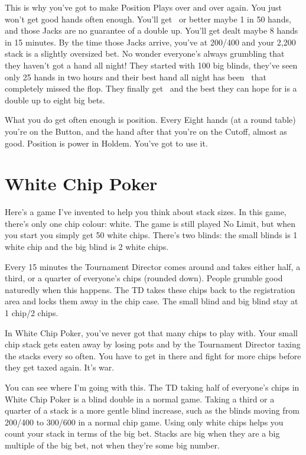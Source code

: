 This is why you've got to make Position Plays over and over again.
You just won't get good hands often enough. You'll get \Jh\Jc\ or better
maybe 1 in 50 hands, and those Jacks are no guarantee of a double up.
You'll get dealt maybe 8 hands in 15 minutes.
By the time those Jacks arrive, you've at 200/400 and your 2,200 stack is
a slightly oversized bet. No wonder everyone's always grumbling that
they haven't got a hand all night! They started with 100 big blinds,
they've seen only 25 hands in two hours and their best hand all
night has been \Jd\nined\ that completely missed the flop.
They finally get \Jh\Jc\ and the best they can hope for is a double
up to eight big bets.

What you do get often enough is position. Every Eight hands (at a
round table) you're on the Button, and the hand after that you're on
the Cutoff, almost as good. Position is power in Holdem. You've got to
use it.

\section{White Chip Poker}

Here's a game I've invented to help you think about stack sizes.
In this game, there's only one chip colour: white. The game is
still played No Limit, but when you start you simply get 50 white chips.
There's two blinds: the small blinds is 1 white chip and the
big blind is 2 white chips.

Every 15 minutes the Tournament Director comes
around and takes either half, a third, or a quarter of everyone's
chips (rounded down). People grumble good naturedly when this happens.
The TD takes these chips back to the registration area and locks them away
in the chip case. The small blind and big blind stay at 1 chip/2 chips.

In White Chip Poker, you've never got that many chips to play with.
Your small chip stack gets eaten away by losing pots and by the
Tournament Director taxing the stacks every so often. You have to
get in there and fight for more chips before they get taxed again.
It's war.

You can see where I'm going with this. The TD taking half of
everyone's chips in White Chip Poker is a blind double in a normal game.
Taking a third or a quarter of a stack is a more gentle blind increase,
such as the blinds moving from 200/400 to 300/600 in a normal chip game.
Using only white chips helps you count your stack in terms of the big bet.
Stacks are big when they are a big multiple of the big bet, not when
they're some big number.

